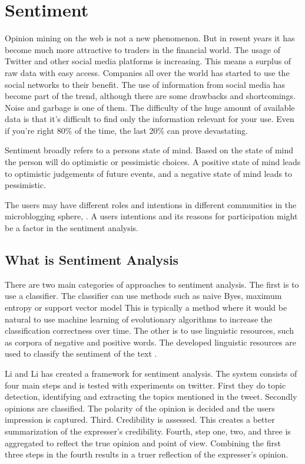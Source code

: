 \section{Sentiment}

Opinion mining on the web is not a new phenomenon. But in resent years it has
become much more attractive to traders in the financial world. The usage of
Twitter and other social media platforms is increasing. This means a surplus of raw data with
easy access. Companies all over the world has started to use the social
networks to their benefit. The use of information from social media has become
part of the trend, although there are some drawbacks and shortcomings. Noise and
garbage is one of them. The difficulty of the huge amount of available data is
that it's difficult to find only the information relevant for your use. Even if you're right 80\% of
the time, the last 20\% can prove devastating.
\cite[]{stevenson12:social_media_stock_pickers}

Sentiment broadly refers to a persons state of mind. Based on the state of mind the person will do optimistic or
pessimistic choices. A positive state of mind leads to optimistic judgements of
future events, and a negative state of mind leads to pessimistic.
\cite[p4]{doukas10:sentiment_and_momentum}

The users may have different roles and intentions in different
communities in the microblogging sphere, \cite[]{java07}. 
A users intentions and its reasons for participation might be a factor in the sentiment analysis.

\subsection{What is Sentiment Analysis}
There are two main categories of approaches to sentiment analysis. 
	The first is to use a classifier. The classifier can use methods such as
naive Byes, maximum entropy or support vector model \cite[]{Li2013206} This is
typically a method where it would be natural to use machine learning of
evolutionary algorithms to increase the classification correctness over time. 
	The other is to use linguistic resources, such as corpora of negative and
positive words. The developed linguistic resources are used to classify the
sentiment of the text \cite[]{Li2013206}.

Li and Li has created a framework for sentiment analysis. The system
consists of four main steps  and is tested with experiments on twitter. 
	First they do topic detection, identifying and extracting the topics
mentioned in the tweet. 
	Secondly opinions are classified. The polarity of the opinion is decided and
the users impression is captured. 	
	Third. Credibility is assessed. This creates a better summarization of the
expresser's credibility. 
	Fourth, step one, two, and three is aggregated to reflect the true opinion
and point of view.
	Combining the first three steps in the fourth results in a truer reflection of
the expresser's opinion. \cite[]{Li2013206} 

